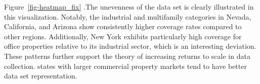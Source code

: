 \documentclass[
  12pt]{article}
\begin{document}
\begin{figure}


\caption{\label{fig-heatmap}}

\end{figure}%

Figure~\ref{fig-heatmap_fix} .The unevenness of the data set is clearly
illustrated in this visualization. Notably, the industrial and
multifamily categories in Nevada, California, and Arizona show
consistently higher coverage rates compared to other regions.
Additionally, New York exhibits particularly high coverage for office
properties relative to its industrial sector, which is an interesting
deviation. These patterns further support the theory of increasing
returns to scale in data collection. states with larger commercial
property markets tend to have better data set representation.
\end{document}
